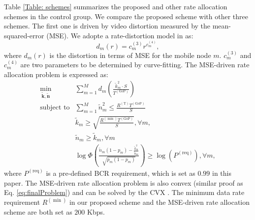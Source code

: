 \documentclass[journal]{IEEEtran}
\begin{document}
Table \ref{Table: schemes} summarizes the proposed and other rate allocation schemes in the control group. We compare the proposed scheme with other three schemes. The first one is driven by video distortion measured by the mean-squared-error (MSE). We adopte a rate-distortion model in \cite{HOSC10} as:
\begin{equation}
d_m\left(r\right)=c_m^{\left(3\right)}r^{c_m^{\left(4\right)}},
\end{equation}
where $d_m\left(r\right)$ is the distortion in terms of MSE for the mobile node $m$. $c_m^{\left(3\right)}$ and $c_m^{\left(4\right)}$ are two parameters to be determined by curve-fitting. The MSE-driven rate allocation problem is expressed as:
\begin{equation}
\begin{array}{rl}
\min_{\mathbf{\tilde{k}},\mathbf{\tilde{n}}} &\sum_{m=1}^{M}d_m\left(\frac{\tilde{k}^2_m \cdot S}{T^{\left(\text{GoP}\right)}}\right) \\
\text{subject to} & \sum\limits_{m=1}^{M}\tilde{n}^2_m\leq \frac{R^{\left(\text{T}\right)}T^{\left(\text{GoP}\right)}}{S}\\
& \tilde{k}_m \geq \sqrt{\frac{R^{\left(\min\right)}T^{\left(\text{GoP}\right)}}{S}}, \forall m, \\
& \tilde{n}_m \geq \tilde{k}_m, \forall m \\
& \log\Phi\left(\frac{\tilde{n}_m\left(1-p_m\right)-\frac{\tilde{k}_m^2}{\tilde{n}_m}}{\sqrt{p_m\left(1-p_m\right)}}\right) \geq \log(P^{\left(\text{req}\right)}), \forall m,
\end{array}
\end{equation}
where $P^{\left(\text{req}\right)}$ is a pre-defined BCR requirement, which is set as $0.99$ \cite{WSHZ13} in this paper. The MSE-driven rate allocation problem is also convex (similar proof as Eq. \eqref{eq:finalProblem}) and can be solved by the CVX \cite{CVX}. The minimum data rate requirement $R^{\left(\min\right)}$ in our proposed scheme and the MSE-driven rate allocation scheme are both set as $200$ Kbps.
\end{document}
